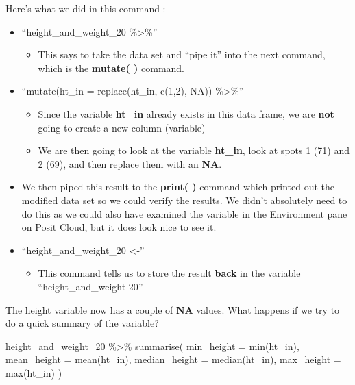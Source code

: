 \documentclass[
  letterpaper,
  DIV=11,
  numbers=noendperiod]{scrreprt}
\newenvironment{Shaded}{\begin{snugshade}}{\end{snugshade}}
\newcommand{\AttributeTok}[1]{\textcolor[rgb]{0.40,0.45,0.13}{#1}}
\newcommand{\FunctionTok}[1]{\textcolor[rgb]{0.28,0.35,0.67}{#1}}
\newcommand{\NormalTok}[1]{\textcolor[rgb]{0.00,0.23,0.31}{#1}}
\newcommand{\SpecialCharTok}[1]{\textcolor[rgb]{0.37,0.37,0.37}{#1}}
\providecommand{\tightlist}{%
  \setlength{\itemsep}{0pt}\setlength{\parskip}{0pt}}\usepackage{longtable,booktabs,array}
\begin{document}
Here's what we did in this command :

\begin{itemize}
\tightlist
\item
  ``height\_and\_weight\_20 \%\textgreater\%''

  \begin{itemize}
  \tightlist
  \item
    This says to take the data set and ``pipe it'' into the next
    command, which is the \textbf{mutate( )} command.
  \end{itemize}
\item
  ``mutate(ht\_in = replace(ht\_in, c(1,2), NA)) \%\textgreater\%''

  \begin{itemize}
  \tightlist
  \item
    Since the variable \textbf{ht\_in} already exists in this data
    frame, we are \textbf{not} going to create a new column (variable)
  \item
    We are then going to look at the variable \textbf{ht\_in}, look at
    spots 1 (71) and 2 (69), and then replace them with an \textbf{NA}.
  \end{itemize}
\item
  We then piped this result to the \textbf{print( )} command which
  printed out the modified data set so we could verify the results. We
  didn't absolutely need to do this as we could also have examined the
  variable in the Environment pane on Posit Cloud, but it does look nice
  to see it.
\item
  ``height\_and\_weight\_20 \textless-''

  \begin{itemize}
  \tightlist
  \item
    This command tells us to store the result \textbf{back} in the
    variable ``height\_and\_weight-20''
  \end{itemize}
\end{itemize}

The height variable now has a couple of \textbf{NA} values. What happens
if we try to do a quick summary of the variable?

\begin{Shaded}
\begin{Highlighting}[]
\NormalTok{height\_and\_weight\_20 }\SpecialCharTok{\%\textgreater{}\%} 
  \FunctionTok{summarise}\NormalTok{(}
    \AttributeTok{min\_height    =} \FunctionTok{min}\NormalTok{(ht\_in),}
    \AttributeTok{mean\_height   =} \FunctionTok{mean}\NormalTok{(ht\_in),}
    \AttributeTok{median\_height =} \FunctionTok{median}\NormalTok{(ht\_in),}
    \AttributeTok{max\_height    =} \FunctionTok{max}\NormalTok{(ht\_in)}
\NormalTok{  )}
\end{Highlighting}
\end{Shaded}
\end{document}
